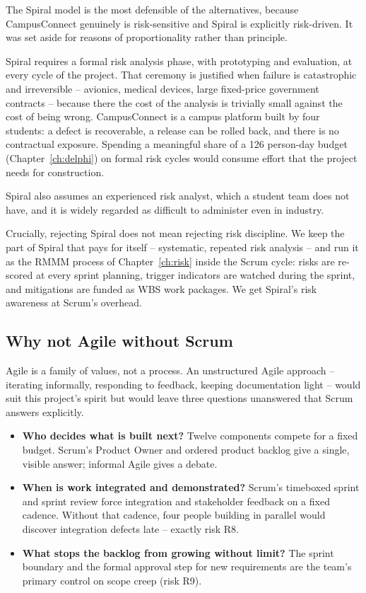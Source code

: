 \documentclass[11pt,a4paper]{report}
\begin{document}
The Spiral model is the most defensible of the alternatives, because
CampusConnect genuinely is risk-sensitive and Spiral is explicitly risk-driven.
It was set aside for reasons of proportionality rather than principle.

Spiral requires a formal risk analysis phase, with prototyping and evaluation, at
every cycle of the project. That ceremony is justified when failure is
catastrophic and irreversible -- avionics, medical devices, large fixed-price
government contracts -- because there the cost of the analysis is trivially small
against the cost of being wrong. CampusConnect is a campus platform built by four
students: a defect is recoverable, a release can be rolled back, and there is no
contractual exposure. Spending a meaningful share of a 126 person-day budget
(Chapter~\ref{ch:delphi}) on formal risk cycles would consume effort that the
project needs for construction.

Spiral also assumes an experienced risk analyst, which a student team does not
have, and it is widely regarded as difficult to administer even in industry.

Crucially, rejecting Spiral does not mean rejecting risk discipline. We keep the
part of Spiral that pays for itself -- systematic, repeated risk analysis -- and
run it as the RMMM process of Chapter~\ref{ch:risk} inside the Scrum cycle:
risks are re-scored at every sprint planning, trigger indicators are watched
during the sprint, and mitigations are funded as WBS work packages. We get
Spiral's risk awareness at Scrum's overhead.

\subsection{Why not Agile without Scrum}

Agile is a family of values, not a process. An unstructured Agile approach --
iterating informally, responding to feedback, keeping documentation light --
would suit this project's spirit but would leave three questions unanswered that
Scrum answers explicitly.

\begin{itemize}
  \item \textbf{Who decides what is built next?} Twelve components compete for a
  fixed budget. Scrum's Product Owner and ordered product backlog give a single,
  visible answer; informal Agile gives a debate.
  \item \textbf{When is work integrated and demonstrated?} Scrum's timeboxed
  sprint and sprint review force integration and stakeholder feedback on a fixed
  cadence. Without that cadence, four people building in parallel would discover
  integration defects late -- exactly risk R8.
  \item \textbf{What stops the backlog from growing without limit?} The sprint
  boundary and the formal approval step for new requirements are the team's
  primary control on scope creep (risk R9).
\end{itemize}
\end{document}
